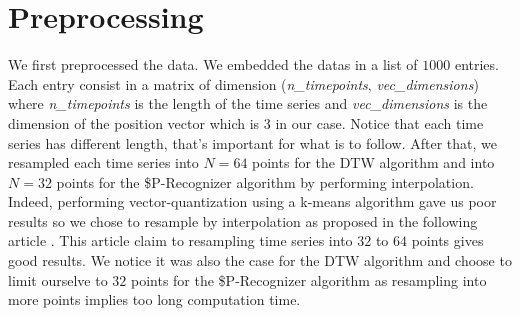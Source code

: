 \section{Preprocessing}

We first preprocessed the data. We embedded the datas in a list of $1000$ entries. Each entry consist in a matrix of dimension (\textit{n\_timepoints}, \textit{vec\_dimensions}) where \textit{n\_timepoints} is the length of the time series and \textit{vec\_dimensions} is the dimension of the position vector which is $3$ in our case. Notice that each time series has different length, that's important for what is to follow. 
After that, we resampled each time series into $N = 64$ points for the DTW algorithm and into $N=32$ points for the \$P-Recognizer algorithm by performing interpolation. Indeed, performing vector-quantization using a k-means algorithm gave us poor results so we chose to resample by interpolation as proposed in the following article \cite[text]{}. This article claim to resampling time series into $32$ to $64$ points gives good results. We notice it was also the case for the DTW algorithm and choose to limit ourselve to $32$ points for the \$P-Recognizer algorithm as resampling into more points implies too long computation time.

